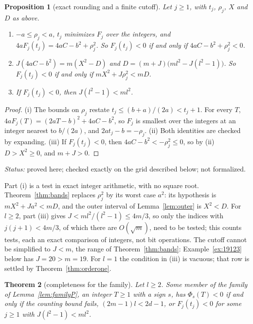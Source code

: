 \documentclass[11pt]{amsart}
\theoremstyle{plain}
\newtheorem{theorem}{Theorem}[section]
\newtheorem{proposition}[theorem]{Proposition}
\theoremstyle{definition}
\theoremstyle{remark}
\newcommand{\status}[1]{\par\smallskip
  {\small\raggedright\noindent\textit{Status:} #1\par}\smallskip}
\begin{document}
\begin{proposition}[exact rounding and a finite cutoff]\label{prop:rounding}
Let $j \ge 1$, with $t_j$, $\rho_j$, $X$ and $D$ as above.
\begin{enumerate}
\item $-a \le \rho_j < a$, $t_j$ minimizes $F_j$ over the integers, and
  $4aF_j(t_j) = 4aC - b^2 + \rho_j^2$. So $F_j(t_j) < 0$ if and only if
  $4aC - b^2 + \rho_j^2 < 0$.
\item $J(4aC - b^2) = m(X^2 - D)$ and $D = (m+J)\bigl(ml^2 - J(l^2-1)\bigr)$. So
  $F_j(t_j) < 0$ if and only if $mX^2 + J\rho_j^2 < mD$.
\item If $F_j(t_j) < 0$, then $J(l^2 - 1) < ml^2$.
\end{enumerate}
\end{proposition}

\begin{proof}
(i) The bounds on $\rho_j$ restate $t_j \le (b+a)/(2a) < t_j + 1$. For every $T$,
$4aF_j(T) = (2aT - b)^2 + 4aC - b^2$, so $F_j$ is smallest over the integers at an integer
nearest to $b/(2a)$, and $2at_j - b = -\rho_j$. (ii) Both identities are checked by
expanding. (iii) If $F_j(t_j) < 0$, then $4aC - b^2 < -\rho_j^2 \le 0$, so by (ii)
$D > X^2 \ge 0$, and $m + J > 0$.
\end{proof}
\status{proved here; checked exactly on the grid described below; not formalized.}

Part (i) is a test in exact integer arithmetic, with no square root.
Theorem~\ref{thm:bands} replaces $\rho_j^2$ by its worst case $a^2$: its hypothesis is
$mX^2 + Ja^2 < mD$, and the outer interval of Lemma~\ref{lem:outer} is $X^2 < D$. For
$l \ge 2$, part (iii) gives $J < ml^2/(l^2-1) \le 4m/3$, so only the indices with
$j(j+1) < 4m/3$, of which there are $O(\sqrt m)$, need to be tested; this counts tests,
each an exact comparison of integers, not bit operations. The cutoff cannot be
simplified to $J < m$, the range of Theorem~\ref{thm:bands}: Example~\ref{ex:19123}
below has $J = 20 > m = 19$. For $l = 1$ the condition in (iii) is vacuous; that row is
settled by Theorem~\ref{thm:orderone}.

\begin{theorem}[completeness for the family]\label{thm:complete}
Let $l \ge 2$. Some member of the family of Lemma~\ref{lem:familyP}, an integer
$T \ge 1$ with a sign $s$, has $\Phi_s(T) < 0$ if and only if the counting bound fails,
$(2m-1)l < 2d - 1$, or $F_j(t_j) < 0$ for some $j \ge 1$ with $J(l^2 - 1) < ml^2$.
\end{theorem}
\end{document}
